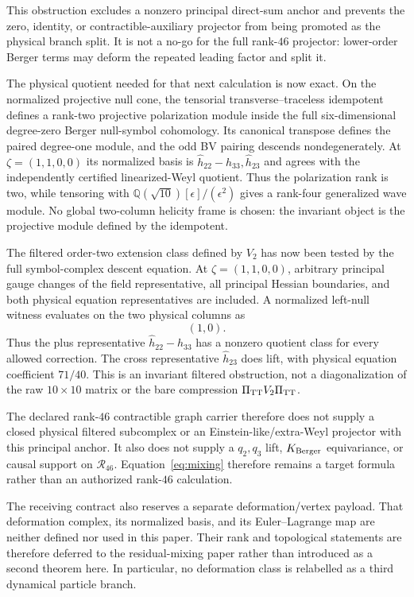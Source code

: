 \documentclass[11pt]{article}
\theoremstyle{definition}
\theoremstyle{remark}
\newcommand{\cR}{\mathcal R}
\begin{document}
This obstruction excludes a nonzero principal direct-sum anchor and prevents
the zero, identity, or contractible-auxiliary projector from being promoted
as the physical branch split.  It is not a no-go for the full rank-$46$
projector: lower-order Berger terms may deform the repeated leading factor and
split it.

The physical quotient needed for that next calculation is now exact.  On the
normalized projective null cone, the tensorial transverse--traceless
idempotent defines a rank-two projective polarization module inside the full
six-dimensional degree-zero Berger null-symbol cohomology.  Its canonical
transpose defines the paired degree-one module, and the odd BV pairing
descends nondegenerately.  At $\zeta=(1,1,0,0)$ its normalized basis is
$\widehat h_{22}-\widehat h_{33},\widehat h_{23}$ and agrees with the
independently certified linearized-Weyl quotient.  Thus the polarization rank
is two, while tensoring with
$\mathbb Q(\sqrt{10})[\epsilon]/(\epsilon^2)$ gives a rank-four generalized
wave module.  No global two-column helicity frame is chosen: the invariant
object is the projective module defined by the idempotent.

The filtered order-two extension class defined by $V_2$ has now been tested
by the full symbol-complex descent equation.  At
$\zeta=(1,1,0,0)$, arbitrary principal gauge changes of the field
representative, all principal Hessian boundaries, and both physical equation
representatives are included.  A normalized left-null witness evaluates on
the two physical columns as
\begin{equation}
 \left(1,0\right).
\end{equation}
Thus the plus representative $\widehat h_{22}-\widehat h_{33}$ has a
nonzero quotient class for every allowed correction.  The cross
representative $\widehat h_{23}$ does lift, with physical equation coefficient
$71/40$.  This is an invariant filtered obstruction, not a diagonalization of
the raw $10\times10$ matrix or the bare compression
$\Pi_{\rm TT}V_2\Pi_{\rm TT}$.

The declared rank-$46$ contractible graph carrier therefore does not supply a
closed physical filtered subcomplex or an Einstein-like/extra-Weyl projector
with this principal anchor.  It also does not supply a $q_2,q_3$ lift,
$K_{\rm Berger}$ equivariance, or causal support on $\cR_{46}$.
Equation~\eqref{eq:mixing} therefore remains a target formula rather than an
authorized rank-$46$ calculation.

The receiving contract also reserves a separate deformation/vertex payload.
That deformation complex, its normalized basis, and its Euler--Lagrange map
are neither defined nor used in this paper.  Their rank and topological
statements are therefore deferred to the residual-mixing paper rather than
introduced as a second theorem here.  In particular, no deformation class is
relabelled as a third dynamical particle branch.
\end{document}
